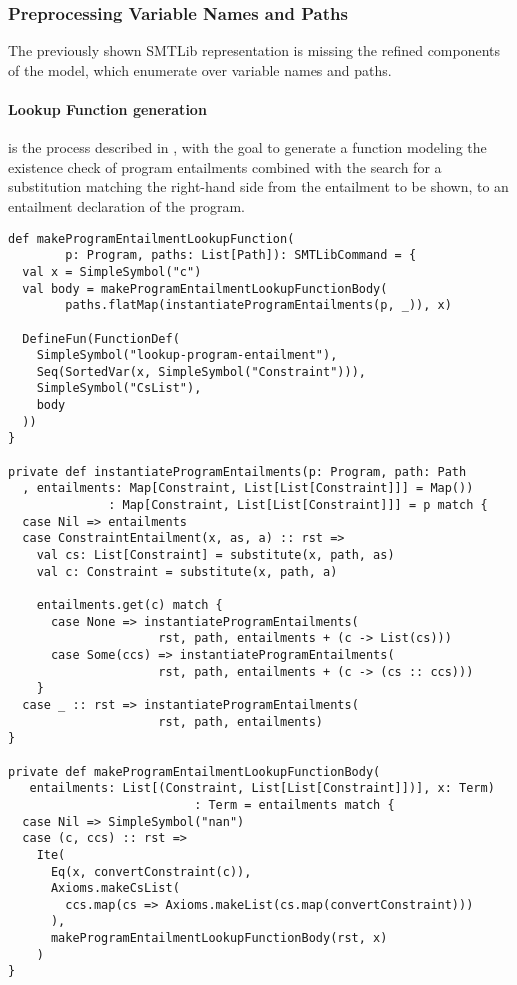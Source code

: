 \subsubsection{Preprocessing Variable Names and Paths}
The previously shown SMTLib representation is
missing the refined components of the model,
which enumerate over variable names and paths.

\paragraph{Lookup Function generation}
is the process described in ,
with the goal to generate a function modeling
the existence check of program entailments
combined with the search for a substitution
matching the right-hand side from the entailment
to be shown, to an entailment declaration of the program.
%
\begin{lstlisting}[caption={Lookup Function Generation},label=lst:lookup,captionpos=b,frame={lines}]
def makeProgramEntailmentLookupFunction(
        p: Program, paths: List[Path]): SMTLibCommand = {
  val x = SimpleSymbol("c")
  val body = makeProgramEntailmentLookupFunctionBody(
        paths.flatMap(instantiateProgramEntailments(p, _)), x)

  DefineFun(FunctionDef(
    SimpleSymbol("lookup-program-entailment"),
    Seq(SortedVar(x, SimpleSymbol("Constraint"))),
    SimpleSymbol("CsList"),
    body
  ))
}

private def instantiateProgramEntailments(p: Program, path: Path
  , entailments: Map[Constraint, List[List[Constraint]]] = Map())
              : Map[Constraint, List[List[Constraint]]] = p match {
  case Nil => entailments
  case ConstraintEntailment(x, as, a) :: rst =>
    val cs: List[Constraint] = substitute(x, path, as)
    val c: Constraint = substitute(x, path, a)

    entailments.get(c) match {
      case None => instantiateProgramEntailments(
                     rst, path, entailments + (c -> List(cs)))
      case Some(ccs) => instantiateProgramEntailments(
                     rst, path, entailments + (c -> (cs :: ccs)))
    }
  case _ :: rst => instantiateProgramEntailments(
                     rst, path, entailments)
}

private def makeProgramEntailmentLookupFunctionBody(
   entailments: List[(Constraint, List[List[Constraint]])], x: Term)
                          : Term = entailments match {
  case Nil => SimpleSymbol("nan")
  case (c, ccs) :: rst =>
    Ite(
      Eq(x, convertConstraint(c)),
      Axioms.makeCsList(
        ccs.map(cs => Axioms.makeList(cs.map(convertConstraint)))
      ),
      makeProgramEntailmentLookupFunctionBody(rst, x)
    )
}
\end{lstlisting}

